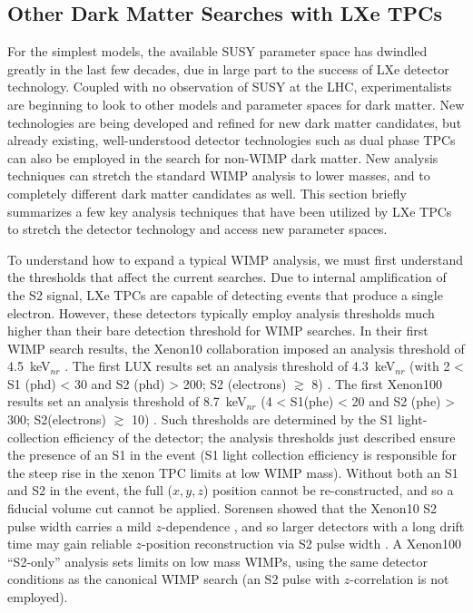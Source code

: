 \subsection{Other Dark Matter Searches with LXe TPCs}
\label{sec:non_wimp_searches_with_lxetpcs}
For the simplest models, the available \ac{SUSY} parameter space has dwindled greatly in the last few decades, due in large part to the success of \ac{LXe} detector technology. Coupled with no observation of \ac{SUSY} at the \ac{LHC}, experimentalists are beginning to look to other models and parameter spaces for dark matter. New technologies are being developed and refined for new dark matter candidates, but already existing, well-understood detector technologies such as dual phase \ac{TPC}s can also be employed in the search for non-\ac{WIMP} dark matter. New analysis techniques can stretch the standard \ac{WIMP} analysis to lower masses, and to completely different dark matter candidates as well. This section briefly summarizes a few key analysis techniques that have been utilized by \ac{LXe} \ac{TPC}s to stretch the detector technology and access new parameter spaces. 

To understand how to expand a typical \ac{WIMP} analysis, we must first understand the thresholds that affect the current searches. Due to internal amplification of the S2 signal, \ac{LXe} \ac{TPC}s are capable of detecting events that produce a single electron. However, these detectors typically employ analysis thresholds much higher than their bare detection threshold for \ac{WIMP} searches. In their first \ac{WIMP} search results, the Xenon10 collaboration imposed an analysis threshold of 4.5~keV$_{nr}$ \cite{Xenon10WIMP}. The first \ac{LUX} results set an analysis threshold of 4.3~keV$_{nr}$ (with 2 < S1 (phd) < 30 and S2 (phd) > 200; S2 (electrons) $\gtrsim$ 8) \cite{LUXFirstResults}. The first Xenon100 results set an analysis threshold of 8.7~keV$_{nr}$ (4 < S1(phe) < 20 and S2 (phe) > 300; S2(electrons) $\gtrsim$ 10) \cite{Xenon100FirstResults}. Such thresholds are determined by the S1 light-collection efficiency of the detector; the analysis thresholds just described ensure the presence of an S1 in the event (S1 light collection efficiency is responsible for the steep rise in the xenon \ac{TPC} limits at low \ac{WIMP} mass). Without both an S1 and S2 in the event, the full ($x,y,z$) position cannot be re-constructed, and so a fiducial volume cut cannot be applied. Sorensen showed that the Xenon10 S2 pulse width carries a mild $z$-dependence \cite{Sorensen2010}, and so larger detectors with a long drift time may gain reliable $z$-position reconstruction via S2 pulse width \cite{SorensenS2Width}. A Xenon100 ``S2-only'' analysis sets limits on low mass \ac{WIMP}s, using the same detector conditions as the canonical \ac{WIMP} search \cite{Aprile2016} (an S2 pulse with $z$-correlation is not employed).  

